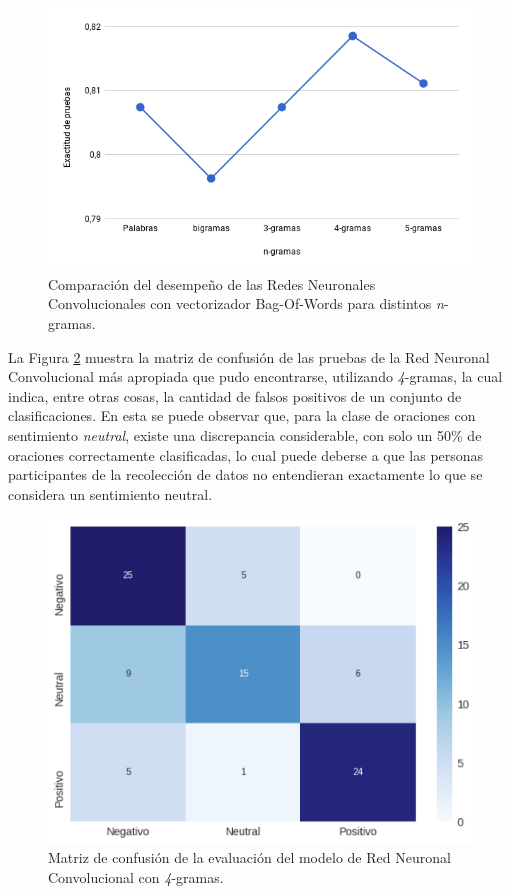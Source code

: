 \documentclass[conference]{IEEEtran}
\begin{document}
        \begin{figure}[htbp]
            \centerline{\includegraphics[width=\linewidth]{figuras/acc_rnc_ngrams.png}}
            \captionsetup{justification=centering}
            \caption{Comparación del desempeño de las Redes Neuronales Convolucionales con vectorizador Bag-Of-Words para distintos \textit{n}-gramas.}
            \label{fig:acc_rnc_ngrams}
        \end{figure}
    
        La Figura \ref{fig:matriz_confusion} muestra la matriz de confusión de las pruebas de la Red Neuronal Convolucional más apropiada que pudo encontrarse, utilizando \textit{4}-gramas, la cual indica, entre otras cosas, la cantidad de falsos positivos de un conjunto de clasificaciones. En esta se puede observar que, para la clase de oraciones con sentimiento \textit{neutral}, existe una discrepancia considerable, con solo un 50\% de oraciones correctamente clasificadas, lo cual puede deberse a que las personas participantes de la recolección de datos no entendieran exactamente lo que se considera un sentimiento neutral.
    
        \begin{figure}[htbp]
            \centerline{\includegraphics[width=\linewidth]{figuras/matriz_confusion.png}}
            \captionsetup{justification=centering}
            \caption{Matriz de confusión de la evaluación del modelo de Red Neuronal Convolucional con \textit{4}-gramas.}
            \label{fig:matriz_confusion}
        \end{figure}
    
\end{document}
